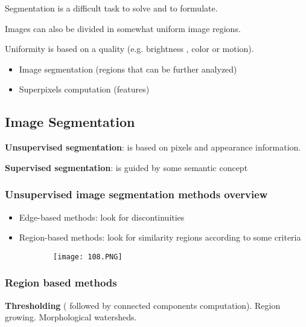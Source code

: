 \documentclass{article}
\begin{document}
Segmentation is a difficult task to solve and to formulate. 

Images can also be divided in somewhat uniform image regions.

Uniformity is based on a quality (e.g. brightness , color or motion).

\begin{itemize}
    \item Image segmentation (regions that can be further analyzed)
    \item Superpixels computation (features)
\end{itemize}

\subsection{Image Segmentation}

\textbf{Unsupervised segmentation}: is based on pixels and appearance information.

\vspace{5mm}

\textbf{Supervised segmentation}: is guided by some semantic concept

\subsubsection{Unsupervised image segmentation methods overview}

\begin{itemize}
    \item Edge-based methods: look for discontinuities
    \item Region-based methods: look for similarity regions according to some criteria
\end{itemize}

\begin{figure}[ht!]
  \centering
  \begin{subfigure}[b]{0.5\linewidth}
    \texttt{[image: 108.PNG]}
  \end{subfigure}
\end{figure}

\subsubsection{Region based methods}

\textbf{Thresholding} ( followed by connected components computation). Region growing. Morphological watersheds.
\end{document}
